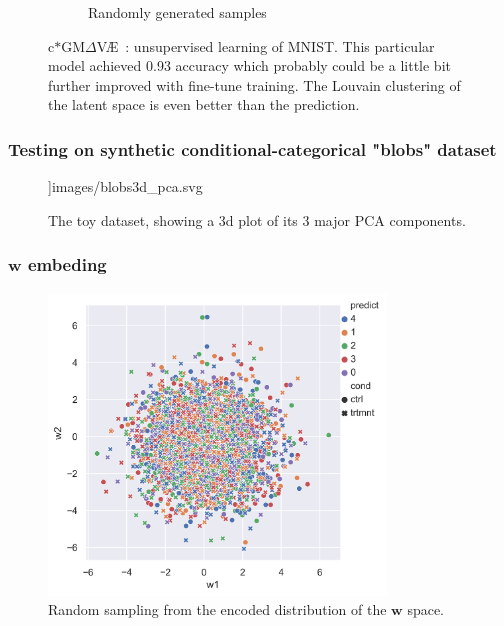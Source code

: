 \documentclass[final]{beamer}
\newcommand{\w}{\mathbf{w}}
\newcommand{\gmvae}{c$\ast$GM$\Delta$V\AE~}
\begin{document}
\begin{frame}
\begin{figure}[h]
\begin{subfigure}[b]{0.3\textwidth}
\caption{Randomly generated samples}
\label{fig:mnist_us_samples}
\end{subfigure}
\caption{\gmvae: unsupervised learning of MNIST. This particular model
achieved 0.93 accuracy which probably could be a little bit further
improved with fine-tune training. The Louvain clustering of the latent space is even better
than the prediction.}
\label{fig:mnist_us_10}
\end{figure}

\end{frame}

\begin{frame}
\frametitle{Testing on synthetic conditional-categorical "blobs" dataset}
\begin{figure}[h]
\centering
\textwidth]{images/blobs3d_pca.svg}
\caption{The toy dataset, showing a 3d plot of its 3 major PCA components.
}
\label{fig:blobs_3d}
\end{figure}
\end{frame}


\begin{frame}
\frametitle{$\w$ embeding}
\begin{figure}[h]
\centering
\includegraphics[width=0.8\textwidth]{images/blobs_cgmvae_learnedprior_w.png}
\caption{Random sampling from the encoded distribution of the $\w$ space. 
}
\label{fig:blobs_lp_w}
\end{figure}
\end{frame}
\end{document}
